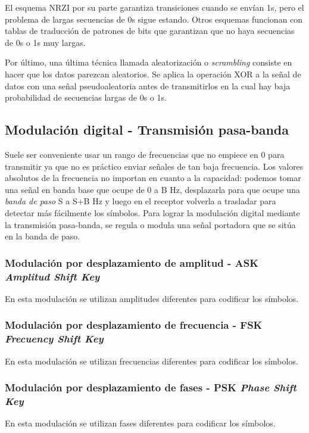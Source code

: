 \documentclass{book}
\begin{document}
	\vspace{3mm}
	El esquema NRZI por su parte garantiza transiciones cuando se envían 1s, pero el problema de largas secuencias de 0s sigue estando. Otros esquemas funcionan con tablas de traducción de patrones de bits que garantizan que no haya secuencias de 0s o 1s muy largas.
	
	\vspace{3mm}
	Por último, una última técnica llamada aleatorización o \textit{scrambling} consiste en hacer que los datos parezcan aleatorios. Se aplica la operación XOR a la señal de datos con una señal pseudoaleatoria antes de transmitirlos en la cual hay baja probabilidad de secuencias largas de 0s o 1s.
	
	\subsection{Modulación digital - Transmisión pasa-banda}
	Suele ser conveniente usar un rango de frecuencias que no empiece en 0 para transmitir ya que no es práctico enviar señales de tan baja frecuencia. Los valores absolutos de la frecuencia no importan en cuanto a la capacidad: podemos tomar una señal en banda base que ocupe de 0 a B Hz, desplazarla para que ocupe una \textit{banda de paso} S a S+B Hz y luego en el receptor volverla a trasladar para detectar más fácilmente los símbolos. Para lograr la modulación digital mediante la transmisión pasa-banda, se regula o modula una señal portadora que se sitúa en la banda de paso.
	
	\subsubsection{Modulación por desplazamiento de amplitud - ASK \textit{Amplitud Shift Key}}
	En esta modulación se utilizan amplitudes diferentes para codificar los símbolos.
	
	\subsubsection{Modulación por desplazamiento de frecuencia - FSK \textit{Frecuency Shift Key}}
	En esta modulación se utilizan frecuencias diferentes para codificar los símbolos.
	
	\subsubsection{Modulación por desplazamiento de fases - PSK \textit{Phase Shift Key}}
	En esta modulación se utilizan fases diferentes para codificar los símbolos.
	
\end{document}
